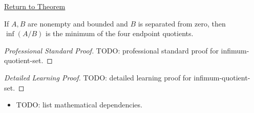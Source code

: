\newpage
{}
\label{prf:infimum-quotient-set}

\begin{remark*}[Return]
\hyperref[thm:infimum-quotient-set]{Return to Theorem}
\end{remark*}

\begin{theorem*}
If $A,B$ are nonempty and bounded and $B$ is separated from zero, then
$\inf(A/B)$ is the minimum of the four endpoint quotients.
\end{theorem*}

\begin{proof}[Professional Standard Proof]
\LRAProofBodyStart
TODO: professional standard proof for infimum-quotient-set.
\end{proof}

\begin{proof}[Detailed Learning Proof]
\LRAProofBodyStart
TODO: detailed learning proof for infimum-quotient-set.
\end{proof}

\begin{remark*}
\end{remark*}

\begin{dependencies}
\begin{itemize}
  \item TODO: list mathematical dependencies.
\end{itemize}
\end{dependencies}

\clearpage
